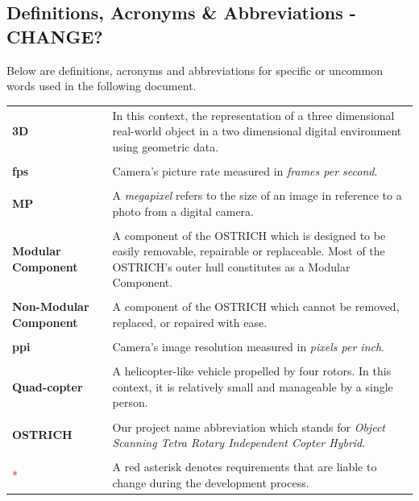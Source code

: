 \documentclass[10pt,letterpaper]{article}
\begin{document}
\newpage


\subsection{Definitions, Acronyms \& Abbreviations - CHANGE?}
Below are definitions, acronyms and abbreviations for specific or uncommon words used in the following document. 
\begin{table}[ht]
  \begin{center}
    \begin{tabular}{p{4cm} p{8.5cm}}

        \textbf{3D} & In this context, the representation of a three dimensional real-world object in a two dimensional digital environment using geometric data. \\ \\
        
        \textbf{fps} & Camera's picture rate measured in \textit{frames per second}. \\ \\
        
        \textbf{MP} & A \textit{megapixel} refers to the size of an image in reference to a photo from a digital camera. \\ \\
        
        \textbf{Modular Component} & A component of the OSTRICH which is designed to be easily removable, repairable or replaceable. Most of the OSTRICH's outer hull constitutes as a Modular Component. \\ \\
        
        \textbf{Non-Modular Component} & A component of the OSTRICH which cannot be removed, replaced, or repaired with ease. \\ \\
        
        \textbf{ppi} & Camera's image resolution measured in \textit{pixels per inch}. \\ \\

        \textbf{Quad-copter} & A helicopter-like vehicle propelled by four rotors. In this context, it is relatively small and manageable by a single person. \\ \\

        \textbf{OSTRICH} & Our project name abbreviation which stands for \textit{Object Scanning Tetra Rotary Independent Copter Hybrid}. \\ \\  %

        \textcolor{red}{*} & A red asterisk denotes requirements that are liable to change during the development process.

    \end{tabular}
  \end{center}
\end{table}
\end{document}
